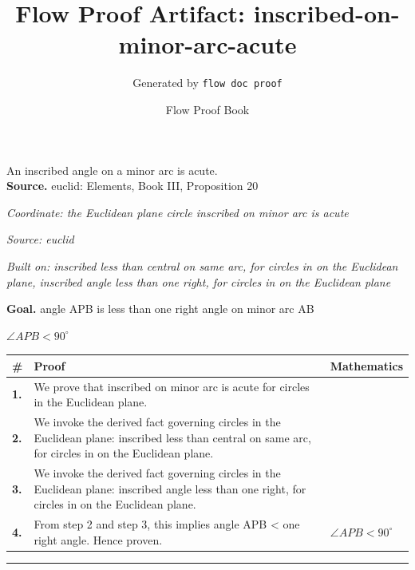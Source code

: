\documentclass[11pt]{article}
\title{Flow Proof Artifact: inscribed-on-minor-arc-acute}
\author{Generated by \texttt{flow doc proof}}
\date{Flow Proof Book}
\theoremstyle{definition}
\begin{document}
\maketitle
An inscribed angle on a minor arc is acute.\\[0.5em]
\textbf{Source.} euclid: Elements, Book III, Proposition 20\\[0.5em]
\bigskip
{}\par
\smallskip\noindent\textit{Coordinate: the Euclidean plane \cdot circle \cdot inscribed on minor arc is acute}\par
\smallskip\noindent\textit{Source: euclid}\par
\smallskip\noindent\textit{Built on: inscribed less than central on same arc, for circles in on the Euclidean plane, inscribed angle less than one right, for circles in on the Euclidean plane}\par
\medskip
\noindent\textbf{Goal.} angle APB is less than one right angle on minor arc AB\par
\noindent$\displaystyle \angle APB < 90^\circ$\par
\medskip
\noindent
\begin{tabular}{@{} >{\raggedright\arraybackslash}p{} >{\raggedright\arraybackslash}p{} >{\raggedleft\arraybackslash}p{} @{}}
\textbf{\#} & \textbf{Proof} & \textbf{Mathematics} \\
\midrule
\textbf{1.} & We prove that inscribed on minor arc is acute for circles in the Euclidean plane. & \\[0.45em]
\textbf{2.} & We invoke the derived fact governing circles in the Euclidean plane: inscribed less than central on same arc, for circles in on the Euclidean plane. & \\[0.45em]
\textbf{3.} & We invoke the derived fact governing circles in the Euclidean plane: inscribed angle less than one right, for circles in on the Euclidean plane. & \\[0.45em]
\textbf{4.} & From step 2 and step 3, this implies angle APB < one right angle. Hence proven. & $\displaystyle \angle APB < 90^\circ$ \\[0.45em]
\bottomrule
\end{tabular}
\label{thm:Geometry-circle-inscribed_on_minor_arc_is_acute}
\par\medskip\hrule
\end{document}
